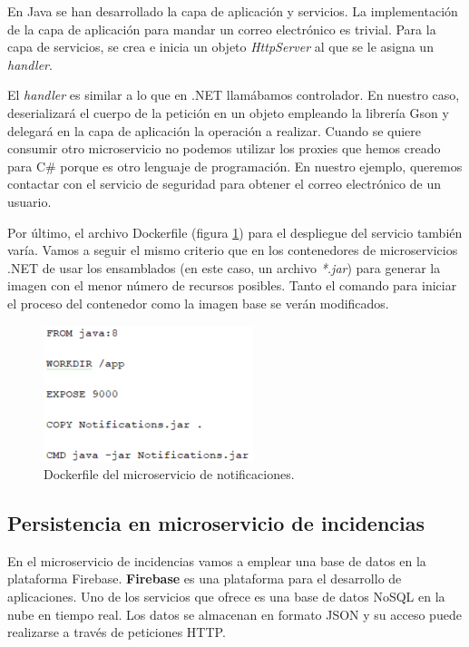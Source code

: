 \documentclass[11pt,spanish,listoffigures]{tfgetsinf}
\begin{document}
En Java se han desarrollado la capa de aplicación y servicios. La implementación de la capa de aplicación para mandar un correo electrónico es trivial. Para la capa de servicios, se crea e inicia un objeto \textit{HttpServer} al que se le asigna un \textit{handler}.

El \textit{handler} es similar a lo que en .NET llamábamos controlador. En nuestro caso, deserializará el cuerpo de la petición en un objeto empleando la librería Gson y delegará en la capa de aplicación la operación a realizar. Cuando se quiere consumir otro microservicio no podemos utilizar los proxies que hemos creado para C\# porque es otro lenguaje de programación. En nuestro ejemplo, queremos contactar con el servicio de seguridad para obtener el correo electrónico de un usuario.

Por último, el archivo Dockerfile (figura \ref{fig:JavaDockerfile}) para el despliegue del servicio también varía. Vamos a seguir el mismo criterio que en los contenedores de microservicios .NET de usar los ensamblados (en este caso, un archivo \textit{*.jar}) para generar la imagen con el menor número de recursos posibles. Tanto el comando para iniciar el proceso del contenedor como la imagen base se verán modificados.

\begin{figure}[h]
\centering
\includegraphics[scale=1]{JavaDockerfile}
\caption{Dockerfile del microservicio de notificaciones.}
\label{fig:JavaDockerfile}
\end{figure}

\subsection{Persistencia en microservicio de incidencias}

En el microservicio de incidencias vamos a emplear una base de datos en la plataforma Firebase. \textbf{Firebase} es una plataforma para el desarrollo de aplicaciones. Uno de los servicios que ofrece es una base de datos NoSQL en la nube en tiempo real. Los datos se almacenan en formato JSON y su acceso puede realizarse a través de peticiones HTTP.
\end{document}
